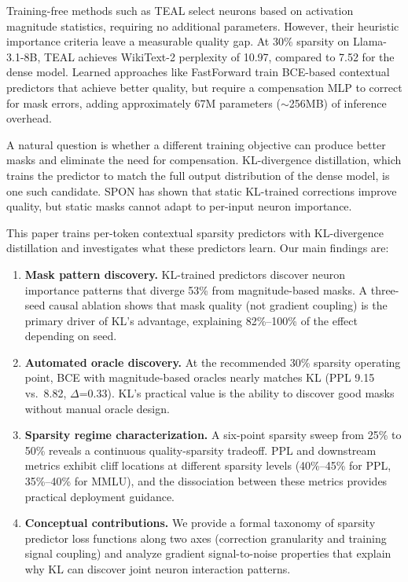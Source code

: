 \documentclass[11pt,a4paper]{article}
\begin{document}
Training-free methods such as TEAL select neurons based on activation magnitude statistics, requiring no additional parameters. However, their heuristic importance criteria leave a measurable quality gap. At 30\% sparsity on Llama-3.1-8B, TEAL achieves WikiText-2 perplexity of 10.97, compared to 7.52 for the dense model. Learned approaches like FastForward train BCE-based contextual predictors that achieve better quality, but require a compensation MLP to correct for mask errors, adding approximately 67M parameters ($\sim$256MB) of inference overhead.

A natural question is whether a different training objective can produce better masks and eliminate the need for compensation. KL-divergence distillation, which trains the predictor to match the full output distribution of the dense model, is one such candidate. SPON has shown that static KL-trained corrections improve quality, but static masks cannot adapt to per-input neuron importance.

This paper trains per-token contextual sparsity predictors with KL-divergence distillation and investigates what these predictors learn. Our main findings are:

\begin{enumerate}
    \item \textbf{Mask pattern discovery.} KL-trained predictors discover neuron importance patterns that diverge 53\% from magnitude-based masks. A three-seed causal ablation shows that mask quality (not gradient coupling) is the primary driver of KL's advantage, explaining 82\%--100\% of the effect depending on seed.

    \item \textbf{Automated oracle discovery.} At the recommended 30\% sparsity operating point, BCE with magnitude-based oracles nearly matches KL (PPL 9.15 vs.\ 8.82, $\Delta$=0.33). KL's practical value is the ability to discover good masks without manual oracle design.

    \item \textbf{Sparsity regime characterization.} A six-point sparsity sweep from 25\% to 50\% reveals a continuous quality-sparsity tradeoff. PPL and downstream metrics exhibit cliff locations at different sparsity levels (40\%--45\% for PPL, 35\%--40\% for MMLU), and the dissociation between these metrics provides practical deployment guidance.

    \item \textbf{Conceptual contributions.} We provide a formal taxonomy of sparsity predictor loss functions along two axes (correction granularity and training signal coupling) and analyze gradient signal-to-noise properties that explain why KL can discover joint neuron interaction patterns.
\end{enumerate}
\end{document}
